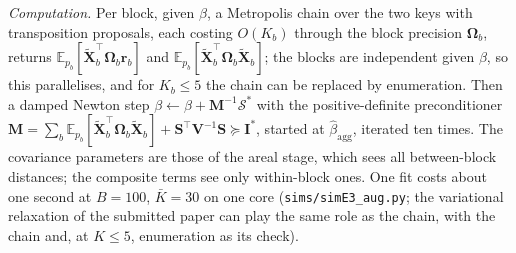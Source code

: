 \documentclass[11pt]{article}
\theoremstyle{definition}
\newcommand{\bX}{\mathbf{X}}
\newcommand{\bV}{\mathbf{V}}
\newcommand{\bOm}{\boldsymbol{\Omega}}
\newcommand{\E}{\mathbb{E}}
\newcommand{\agg}{\mathrm{agg}}
\begin{document}
\emph{Computation.} Per block, given $\beta$, a Metropolis chain over the two keys with transposition proposals, each costing $O(K_b)$ through the block precision $\bOm_b$, returns $\E_{p_b}[\tilde{\bX}_b^\top\bOm_b\bm r_b]$ and $\E_{p_b}[\tilde{\bX}_b^\top\bOm_b\tilde{\bX}_b]$; the blocks are independent given $\beta$, so this parallelises, and for $K_b\le5$ the chain can be replaced by enumeration. Then a damped Newton step $\beta\leftarrow\beta+\mathbf M^{-1}\bm{\mathcal S}^\ast$ with the positive-definite preconditioner $\mathbf M=\sum_b\E_{p_b}[\tilde{\bX}_b^\top\bOm_b\tilde{\bX}_b]+\mathbf S^\top\bV^{-1}\mathbf S\succeq\mathbf I^\ast$, started at $\hat\beta_\agg$, iterated ten times. The covariance parameters are those of the areal stage, which sees all between-block distances; the composite terms see only within-block ones. One fit costs about one second at $B=100$, $\bar K=30$ on one core (\texttt{sims/simE3\_aug.py}; the variational relaxation of the submitted paper can play the same role as the chain, with the chain and, at $K\le5$, enumeration as its check).
\end{document}
